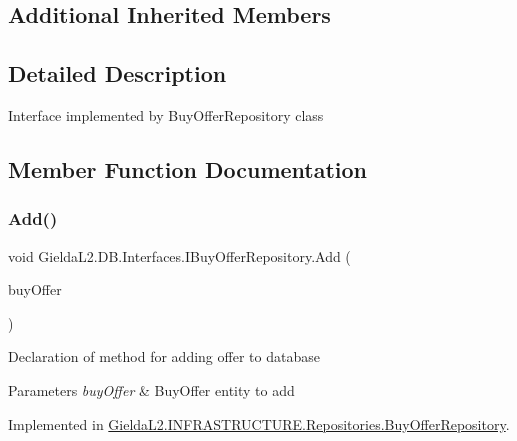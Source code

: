 \subsection*{Additional Inherited Members}


\subsection{Detailed Description}
Interface implemented by Buy\+Offer\+Repository class 



\subsection{Member Function Documentation}
\mbox{\label{interface_gielda_l2_1_1_d_b_1_1_interfaces_1_1_i_buy_offer_repository_aae66f2818cb5476f701c68266e413d87}} 
\subsubsection{\texorpdfstring{Add()}{Add()}}
{\footnotesize\ttfamily void Gielda\+L2.\+D\+B.\+Interfaces.\+I\+Buy\+Offer\+Repository.\+Add (\begin{DoxyParamCaption}\item[{\mbox{\hyperlink{class_gielda_l2_1_1_d_b_1_1_entities_1_1_buy_offer}{Buy\+Offer}}}]{buy\+Offer }\end{DoxyParamCaption})}



Declaration of method for adding offer to database 


\begin{DoxyParams}{Parameters}
{\em buy\+Offer} & Buy\+Offer entity to add\\
\hline
\end{DoxyParams}


Implemented in \mbox{\hyperlink{class_gielda_l2_1_1_i_n_f_r_a_s_t_r_u_c_t_u_r_e_1_1_repositories_1_1_buy_offer_repository_aeffc5aeab22da20ecaa887219079c5a1}{Gielda\+L2.\+I\+N\+F\+R\+A\+S\+T\+R\+U\+C\+T\+U\+R\+E.\+Repositories.\+Buy\+Offer\+Repository}}.

\mbox{\label{interface_gielda_l2_1_1_d_b_1_1_interfaces_1_1_i_buy_offer_repository_aa086036b9ec0331e455c846193679851}} 
